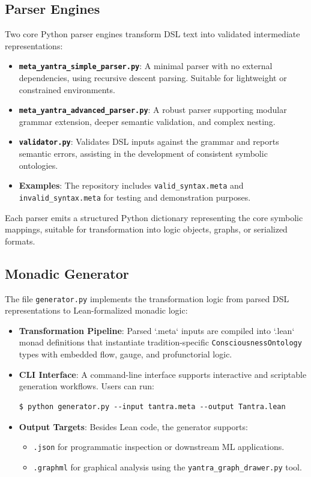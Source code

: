 \documentclass[12pt]{article}
\theoremstyle{plain}
\begin{document}
\subsection{Parser Engines}

Two core Python parser engines transform DSL text into validated intermediate representations:

\begin{itemize}
  \item \textbf{\texttt{meta\_yantra\_simple\_parser.py}}: A minimal parser with no external dependencies, using recursive descent parsing. Suitable for lightweight or constrained environments.
  \item \textbf{\texttt{meta\_yantra\_advanced\_parser.py}}: A robust parser supporting modular grammar extension, deeper semantic validation, and complex nesting.
  \item \textbf{\texttt{validator.py}}: Validates DSL inputs against the grammar and reports semantic errors, assisting in the development of consistent symbolic ontologies.
  \item \textbf{Examples}: The repository includes \texttt{valid\_syntax.meta} and \texttt{invalid\_syntax.meta} for testing and demonstration purposes.
\end{itemize}

Each parser emits a structured Python dictionary representing the core symbolic mappings, suitable for transformation into logic objects, graphs, or serialized formats.

\subsection{Monadic Generator}

The file \texttt{generator.py} implements the transformation logic from parsed DSL representations to Lean-formalized monadic logic:

\begin{itemize}
  \item \textbf{Transformation Pipeline}: Parsed `.meta` inputs are compiled into `.lean` monad definitions that instantiate tradition-specific \texttt{ConsciousnessOntology} types with embedded flow, gauge, and profunctorial logic.
  \item \textbf{CLI Interface}: A command-line interface supports interactive and scriptable generation workflows. Users can run:
\begin{verbatim}
$ python generator.py --input tantra.meta --output Tantra.lean
\end{verbatim}
  \item \textbf{Output Targets}: Besides Lean code, the generator supports:
    \begin{itemize}
      \item \texttt{.json} for programmatic inspection or downstream ML applications.
      \item \texttt{.graphml} for graphical analysis using the \texttt{yantra\_graph\_drawer.py} tool.
    \end{itemize}
\end{itemize}
\end{document}
